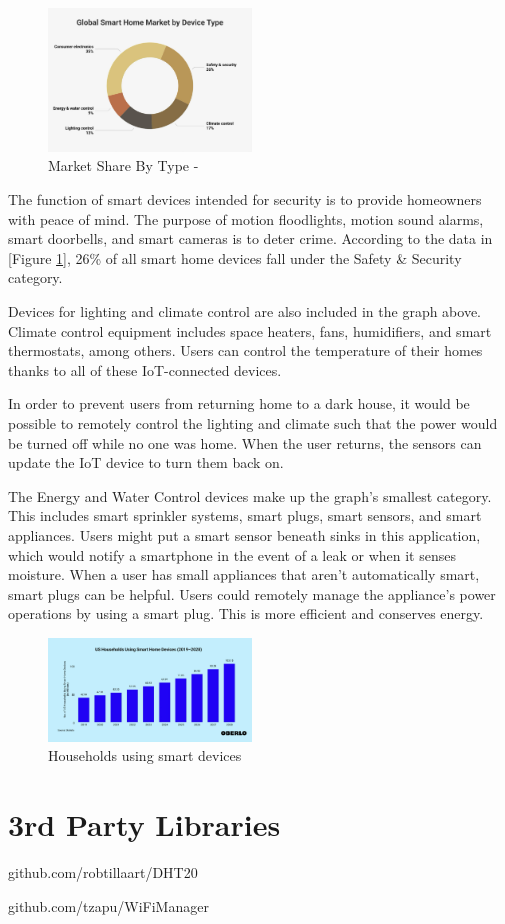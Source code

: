 \documentclass[10pt, journal]{IEEEtran} %
\begin{document}
\begin{figure}[htbp]
    \centering
    \includegraphics[width=0.48\textwidth]{images/share_by_device.png}
    \caption{Market Share By Type - \cite[Mariotti]{Mariotti}}
    \label{fig:sbd}
\end{figure}

The function of smart devices intended for security is to provide homeowners with peace of mind. 
The purpose of motion floodlights, motion sound alarms, smart doorbells, and smart cameras is to deter crime. 
According to the data in [Figure \ref{fig:sbd}], 26\% of all smart home devices fall under the Safety \& Security category. 

Devices for lighting and climate control are also included in the graph above. 
Climate control equipment includes space heaters, fans, humidifiers, and smart thermostats, among others.
Users can control the temperature of their homes thanks to all of these IoT-connected devices.

In order to prevent users from returning home to a dark house, 
it would be possible to remotely control the lighting and climate 
such that the power would be turned off while no one was home.
When the user returns, the sensors can update the IoT device to turn them back on.

The Energy and Water Control devices make up the graph's smallest category. 
This includes smart sprinkler systems, smart plugs, smart sensors, and smart appliances. 
Users might put a smart sensor beneath sinks in this application,
which would notify a smartphone in the event of a leak or when it senses moisture. 
When a user has small appliances that aren't automatically smart, smart plugs can be helpful. 
Users could remotely manage the appliance's power operations by using a smart plug. 
This is more efficient and conserves energy.

\begin{figure}[htbp]
    \centering
    \includegraphics[width=0.48\textwidth]{images/oberlo.png}
    \caption{Households using smart devices \cite[oberlo]{oberlo}}
    \label{fig:oberlo}
\end{figure}


\pagebreak

    
    

\section{3rd Party Libraries}
github.com/robtillaart/DHT20

github.com/tzapu/WiFiManager
\end{document}
